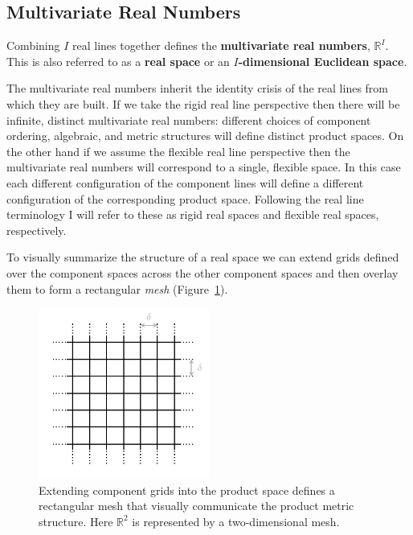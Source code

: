 \documentclass[
  letterpaper,
  DIV=11,
  numbers=noendperiod]{scrartcl}
\begin{document}
\hypertarget{multivariate-real-numbers}{%
\subsection{Multivariate Real Numbers}\label{multivariate-real-numbers}}

Combining \(I\) real lines together defines the \textbf{multivariate
real numbers}, \(\mathbb{R}^{I}\). This is also referred to as a
\textbf{real space} or an \textbf{\(I\)-dimensional Euclidean space}.

The multivariate real numbers inherit the identity crisis of the real
lines from which they are built. If we take the rigid real line
perspective then there will be infinite, distinct multivariate real
numbers: different choices of component ordering, algebraic, and metric
structures will define distinct product spaces. On the other hand if we
assume the flexible real line perspective then the multivariate real
numbers will correspond to a single, flexible space. In this case each
different configuration of the component lines will define a different
configuration of the corresponding product space. Following the real
line terminology I will refer to these as rigid real spaces and flexible
real spaces, respectively.

To visually summarize the structure of a real space we can extend grids
defined over the component spaces across the other component spaces and
then overlay them to form a rectangular \emph{mesh}
(Figure~\ref{fig-real_space_grid}).

\begin{figure}

{\centering \includegraphics[width=0.5\textwidth,height=\textheight]{figures/real_space_grid/real_space_grid.pdf}

}

\caption{\label{fig-real_space_grid}Extending component grids into the
product space defines a rectangular mesh that visually communicate the
product metric structure. Here \(\mathbb{R}^{2}\) is represented by a
two-dimensional mesh.}

\end{figure}
\end{document}
